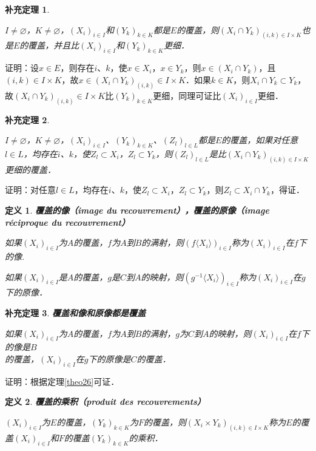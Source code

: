 \documentclass[12pt, a4paper, oneside]{book}
\newtheorem{cor}{补充定理}
\newtheorem{de}{定义}
\begin{document}
			\begin{cor}\label{cor109}
				\hfill\par
				$I\neq \varnothing$，$K\neq \varnothing$，$(X_i)_{i\in I}$和$(Y_k)_{k\in K}$都是$E$的覆盖，则$(X_i\cap Y_k)_{(i, k)\in I\times K}$也是$E$的覆盖，并且比$(X_i)_{i\in I}$和$(Y_k)_{k\in K}$更细．
			\end{cor}
			证明：设$x\in E$，则存在$i$、$k$，使$x\in X_i$，$x\in Y_k$，则$x\in (X_i\cap Y_k)$，且$(i, k)\in I\times K$，故$x\in (X_i\cap Y_k)_{(i, k)}\in I\times K$．如果$k\in K$，则$X_i\cap Y_k\subset Y_k$，故$(X_i\cap Y_k)_{(i, k)}\in I\times K$比$(Y_k)_{k\in K}$更细，同理可证比$(X_i)_{i\in I}$更细．
			
			\begin{cor}\label{cor110}
				\hfill\par
				$I\neq \varnothing$，$K\neq \varnothing$，$(X_i)_{i\in I}$、$(Y_k)_{k\in K}$、$(Z_l)_{l\in L}$都是$E$的覆盖，如果对任意$l\in L$，均存在$i$、$k$，使$Z_l\subset X_i$，$Z_l\subset Y_k$，则$(Z_l)_{l\in L}$是比$(X_i\cap Y_k)_{(i, k)\in I\times K}$更细的覆盖．
			\end{cor}
			证明：对任意$l\in L$，均存在$i$、$k$，使$Z_l\subset X_i$，$Z_l\subset Y_k$，则$Z_l\subset X_i\cap Y_k$，得证．

			\begin{de}
				\textbf{覆盖的像（image du recouvrement），覆盖的原像（image réciproque du recouvrement）}
				\par
				如果$(X_i)_{i\in I}$为$A$的覆盖，$f$为$A$到$B$的满射，则$(f\langle X_i\rangle)_{i\in I}$称为$(X_i)_{i\in I}$在$f$下的像.
				\par
				如果$(X_i)_{i\in I}$是$A$的覆盖，$g$是$C$到$A$的映射，则$(g^{-1}\langle X_i\rangle)_{i\in I}$称为$(X_i)_{i\in I}$在$g$下的原像．
			\end{de}
				
			\begin{cor}\label{cor111}
				\textbf{覆盖和像和原像都是覆盖}
				\par
				如果$(X_i)_{i\in I}$为$A$的覆盖，$f$为$A$到$B$的满射，$g$为$C$到$A$的映射，则$(X_i)_{i\in I}$在$f$下的像是$B$\\的覆盖，$(X_i)_{i\in I}$在$g$下的原像是$C$的覆盖．
			\end{cor}
			证明：根据定理\ref{theo26}可证．

			\begin{de}
				\textbf{覆盖的乘积（produit des recouvrements）}
				\par
				$(X_i)_{i\in I}$为$E$的覆盖，$(Y_k)_{k\in K}$为$F$的覆盖，则$(X_i\times Y_k)_{(i, k)\in I\times K}$称为$E$的覆盖$(X_i)_{i\in I}$和$F$的覆盖$(Y_k)_{k\in K}$的乘积．
			\end{de}
			
\end{document}

